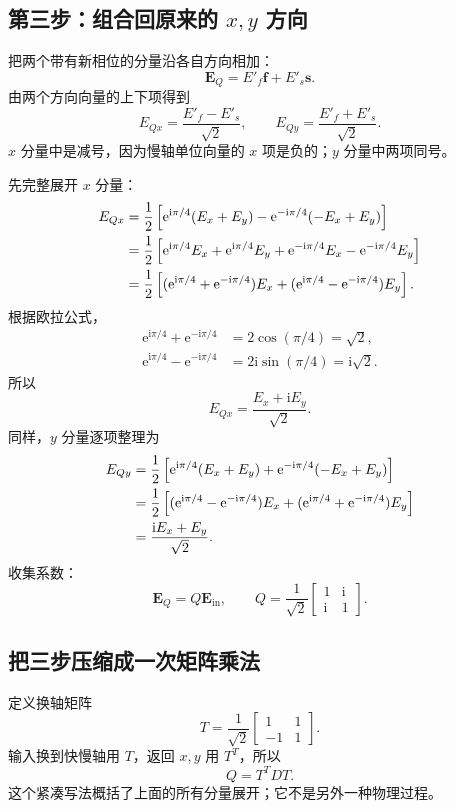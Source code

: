 \documentclass[UTF8,fontset=fandol,11pt,a4paper]{ctexart}
\newcommand{\ii}{\mathrm i}
\newcommand{\ee}{\mathrm e}
\begin{document}
\subsection{第三步：组合回原来的 $x,y$ 方向}
把两个带有新相位的分量沿各自方向相加：
\begin{equation}
\mathbf E_Q=E'_f\mathbf f+E'_s\mathbf s.
\end{equation}
由两个方向向量的上下项得到
\begin{equation}
E_{Qx}=\frac{E'_f-E'_s}{\sqrt2},\qquad
E_{Qy}=\frac{E'_f+E'_s}{\sqrt2}.
\end{equation}
$x$ 分量中是减号，因为慢轴单位向量的 $x$ 项是负的；$y$ 分量中两项同号。

先完整展开 $x$ 分量：
\begin{align}
E_{Qx}
&=\frac12\left[\ee^{\ii\pi/4}(E_x+E_y)-\ee^{-\ii\pi/4}(-E_x+E_y)\right]\notag\\
&=\frac12\left[\ee^{\ii\pi/4}E_x+\ee^{\ii\pi/4}E_y
+\ee^{-\ii\pi/4}E_x-\ee^{-\ii\pi/4}E_y\right]\notag\\
&=\frac12\left[(\ee^{\ii\pi/4}+\ee^{-\ii\pi/4})E_x
+(\ee^{\ii\pi/4}-\ee^{-\ii\pi/4})E_y\right].
\end{align}
根据欧拉公式，
\begin{align}
\ee^{\ii\pi/4}+\ee^{-\ii\pi/4}&=2\cos(\pi/4)=\sqrt2,\\
\ee^{\ii\pi/4}-\ee^{-\ii\pi/4}&=2\ii\sin(\pi/4)=\ii\sqrt2.
\end{align}
所以
\begin{equation}
E_{Qx}=\frac{E_x+\ii E_y}{\sqrt2}.
\end{equation}
同样，$y$ 分量逐项整理为
\begin{align}
E_{Qy}
&=\frac12\left[\ee^{\ii\pi/4}(E_x+E_y)+\ee^{-\ii\pi/4}(-E_x+E_y)\right]\notag\\
&=\frac12\left[(\ee^{\ii\pi/4}-\ee^{-\ii\pi/4})E_x
+(\ee^{\ii\pi/4}+\ee^{-\ii\pi/4})E_y\right]\notag\\
&=\frac{\ii E_x+E_y}{\sqrt2}.
\end{align}
收集系数：
\begin{equation}
\boxed{\mathbf E_Q=Q\mathbf E_{\mathrm{in}},\qquad
Q=\frac1{\sqrt2}\begin{bmatrix}1&\ii\\\ii&1\end{bmatrix}.}
\end{equation}

\subsection{把三步压缩成一次矩阵乘法}
定义换轴矩阵
\begin{equation}
T=\frac1{\sqrt2}\begin{bmatrix}1&1\\-1&1\end{bmatrix}.
\end{equation}
输入换到快慢轴用 $T$，返回 $x,y$ 用 $T^T$，所以
\begin{equation}
\boxed{Q=T^TDT.}
\end{equation}
这个紧凑写法概括了上面的所有分量展开；它不是另外一种物理过程。
\end{document}
